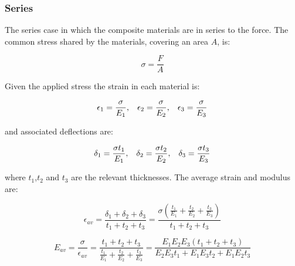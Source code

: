 \documentclass[hidelinks]{article}
\numberwithin{equation}{section}
\begin{document}
    \subsubsection{Series}
    
    The series case in which the composite materials are in series to the force. The 
    common stress shared by the materials, covering an area $A$, is:

    \begin{equation}\label{eq: series-youngs-mod-simple-stress}
        \sigma = \frac{F}{A}
    \end{equation}

    \noi Given the applied stress the strain in each material is:

    \begin{equation}\label{eq: series-youngs-mod-strains}
        \epsilon_1 = \frac{\sigma}{E_1}, \hspace{0.3cm} 
        \epsilon_2 = \frac{\sigma}{E_2}, \hspace{0.3cm} 
        \epsilon_3= \frac{\sigma}{E_3}
    \end{equation}

    \noi and associated deflections are:

    \begin{equation}\label{eq: series-youngs-mod-delfections}
        \delta_1 = \frac{\sigma t_1}{E_1}, \hspace{0.3cm} 
        \delta_2 = \frac{\sigma t_2}{E_2}, \hspace{0.3cm} 
        \delta_3 = \frac{\sigma t_3}{E_3}
    \end{equation}

    \noi where $t_1$,$t_2$ and $t_3$ are the relevant thicknesses. The average 
    strain and modulus are:

    \begin{equation}\label{eq: series-youngs-mod-av-strain}
        \epsilon_{av} = \frac{\delta_1 + \delta_2 + \delta_3}
        {t_1 + t_2 + t_3} = \frac{\sigma (\frac{t_1}{E_1} + \frac{t_2}{E_2} + 
        \frac{t_3}{E_3})}{t_1 + t_2 + t_3}
    \end{equation}

    \begin{equation}\label{eq: series-youngs-mod-av-mod}
        E_{av} = \frac{\sigma}{\epsilon_{av}} = \frac{t_1 + t_2 + t_3}
        {\frac{t_1}{E_1} + \frac{t_2}{E_2} + \frac{t_3}{E_3}} = 
        \frac{E_1E_2E_3(t_1+t_2+t_3)}{E_2E_3t_1 + E_1E_3t_2 + E_1E_2t_3}
    \end{equation}\\
\end{document}
